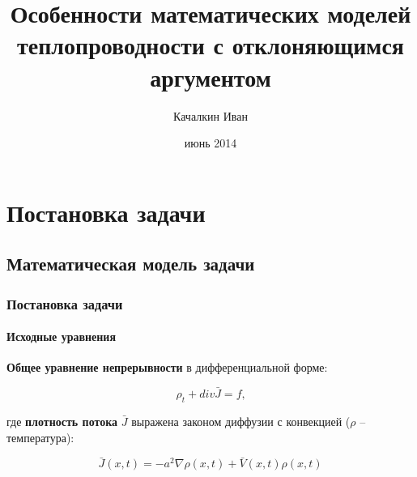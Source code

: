 \documentclass{beamer}
\numberwithin{equation}{section}
\begin{document}
    
    \title{Особенности математических моделей теплопроводности с отклоняющимся аргументом}
    
    \author{Качалкин Иван}
    
    
    \date{июнь 2014}

    {
        \frame{\titlepage}
    }

    \section{Постановка задачи}
    \subsection{Математическая модель задачи}
    \begin{frame}
        \frametitle{Постановка задачи}
        \framesubtitle{Исходные уравнения}

        \textbf{Общее уравнение непрерывности} в дифференциальной форме:

        \begin{equation}
            \rho_t + div \bar{J} = f \text{,}
        \end{equation}

        где \textbf{плотность потока} $\bar{J}$ выражена законом диффузии с конвекцией ($\rho$ \--- температура):

        \begin{equation}
            \bar{J}(x,t) = -a^2 \nabla \rho(x,t) + \bar{V}(x,t) \rho(x,t)
        \end{equation}

    \end{frame}
\end{document}
